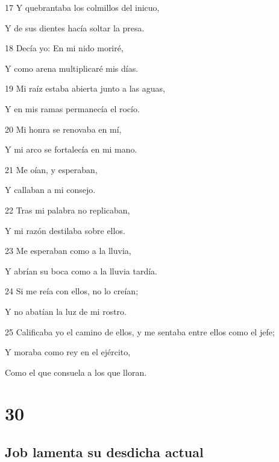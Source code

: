 \par 17 Y quebrantaba los colmillos del inicuo,
\par Y de sus dientes hacía soltar la presa.
\par 18 Decía yo: En mi nido moriré,
\par Y como arena multiplicaré mis días.
\par 19 Mi raíz estaba abierta junto a las aguas,
\par Y en mis ramas permanecía el rocío.
\par 20 Mi honra se renovaba en mí,
\par Y mi arco se fortalecía en mi mano.
\par 21 Me oían, y esperaban,
\par Y callaban a mi consejo.
\par 22 Tras mi palabra no replicaban, 
\par Y mi razón destilaba sobre ellos.
\par 23 Me esperaban como a la lluvia,
\par Y abrían su boca como a la lluvia tardía.
\par 24 Si me reía con ellos, no lo creían;
\par Y no abatían la luz de mi rostro.
\par 25 Calificaba yo el camino de ellos, y me sentaba entre ellos como el jefe;
\par Y moraba como rey en el ejército,
\par Como el que consuela a los que lloran.

\chapter{30}

\section*{Job lamenta su desdicha actual}

